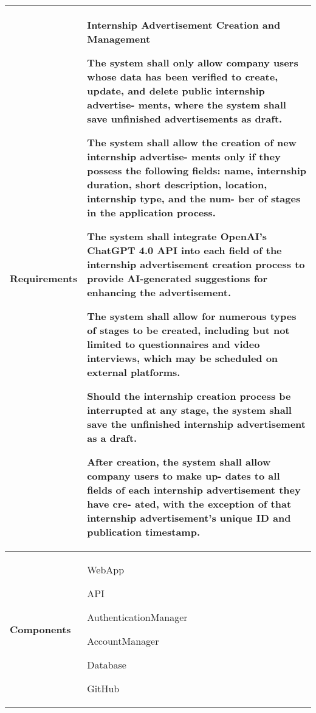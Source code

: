 \begin{table}[ht]
    \centering
    \renewcommand{\arraystretch}{1.5} %
    \begin{tabular}{|C{0.3\textwidth}|L{0.65\textwidth}|} %
        \hline
        \textbf{Requirements} & 
        \textbf{Internship Advertisement Creation and Management} \par
        [FR20] The system shall only allow company users whose data has been
        verified to create, update, and delete public internship advertise-
        ments, where the system shall save unfinished advertisements as
        draft. \par
        [FR21] The system shall allow the creation of new internship advertise-
        ments only if they possess the following fields: name, internship
        duration, short description, location, internship type, and the num-
        ber of stages in the application process. \par
        [FR22] The system shall integrate OpenAI’s ChatGPT 4.0 API into each
        field of the internship advertisement creation process to provide
        AI-generated suggestions for enhancing the advertisement. \par
        [FR23] The system shall allow for numerous types of stages to be created,
        including but not limited to questionnaires and video interviews,
        which may be scheduled on external platforms. \par
        [FR24] Should the internship creation process be interrupted at any stage,
        the system shall save the unfinished internship advertisement as a
        draft. \par
        [FR25] After creation, the system shall allow company users to make up-
        dates to all fields of each internship advertisement they have cre-
        ated, with the exception of that internship advertisement’s unique
        ID and publication timestamp. \\
        \hline
        \textbf{Components} & 
        WebApp \par
        API \par
        AuthenticationManager \par
        AccountManager \par
        Database \par
        GitHub \\
        \hline
    \end{tabular}
\end{table}


